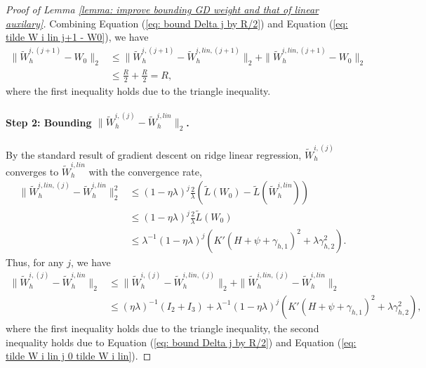 \documentclass{article} \usepackage{iclr2023/iclr2023_conference,times}
\begin{document}
\begin{proof}[Proof of Lemma \ref{lemma: improve bounding GD weight and that of linear auxilary}]
Combining Equation (\ref{eq: bound Delta j by R/2}) and Equation (\ref{eq: tilde W i lin j+1 - W0}), we have 
\begin{align*}
    \| \tilde{W}_h^{i, (j+1)} - W_0 \|_2 &\leq  \| \tilde{W}_h^{i, (j+1)} - \tilde{W}^{i,lin,(j+1)}_h \|_2 + \| \tilde{W}^{i,lin,(j+1)}_h - W_0 \|_2 \\ 
    &\leq \frac{R}{2} + \frac{R}{2} = R,
\end{align*}
where the first inequality holds due to the triangle inequality. 
\paragraph{Step 2: Bounding $\| \tilde{W}_h^{i, (j)} - \tilde{W}_h^{i,lin} \|_2$.} By the standard result of gradient descent on ridge linear regression, $\tilde{W}_h^{i, (j)}$ converges to $\tilde{W}_h^{i,lin}$ with the convergence rate, 
\begin{align*}
    \|\tilde{W}_h^{i, lin, (j)} - \tilde{W}_h^{i,lin} \|_2^2 &\leq (1 - \eta \lambda)^j \frac{2}{ \lambda} (\tilde{L}(W_0) - \tilde{L}(\tilde{W}_h^{i,lin})) \\ 
    &\leq (1 - \eta \lambda)^j \frac{2}{ \lambda} \tilde{L}(W_0) \\ 
    & \leq \lambda^{-1}(1 - \eta \lambda)^j \left( K'(H + \psi + \gamma_{h,1} )^2 + \lambda \gamma_{h,2}^2\right).
\end{align*}
Thus, for any $j$, we have 
\begin{align}
    \| \tilde{W}_h^{i, (j)} - \tilde{W}_h^{i,lin}  \|_2 &\leq  \| \tilde{W}_h^{i, (j)} - \tilde{W}^{i,lin,(j)}_h \|_2 + \| \tilde{W}^{i,lin,(j)}_h - \tilde{W}_h^{i,lin}  \|_2 \nonumber \\ 
    &\leq (\eta \lambda)^{-1} (I_2 + I_3) + \lambda^{-1}(1 - \eta \lambda)^j \left( K'(H + \psi + \gamma_{h,1} )^2 + \lambda \gamma_{h,2}^2\right), 
    \label{eq: tilde W i lin j 0 tilde W i lin}
\end{align}
where the first inequality holds due to the triangle inequality, the second inequality holds due to Equation (\ref{eq: bound Delta j by R/2}) and Equation (\ref{eq: tilde W i lin j 0 tilde W i lin}). 
\end{proof}
\end{document}
